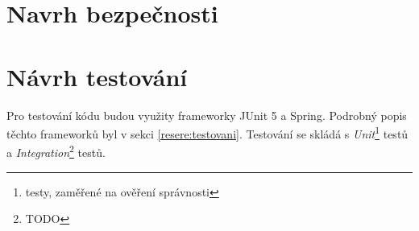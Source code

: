 \section{Navrh bezpečnosti}\label{navrh:bezpecnost}

\section{Návrh testování}\label{navrh:testovani}
    Pro testování kódu budou využity frameworky JUnit 5 a Spring. Podrobný popis těchto frameworků byl v sekci \ref{resere:testovani}. Testování se skládá s \textit{Unit}\footnote{testy, zaměřené na ověření správnosti } testů a \textit{Integration}\footnote{TODO} testů.